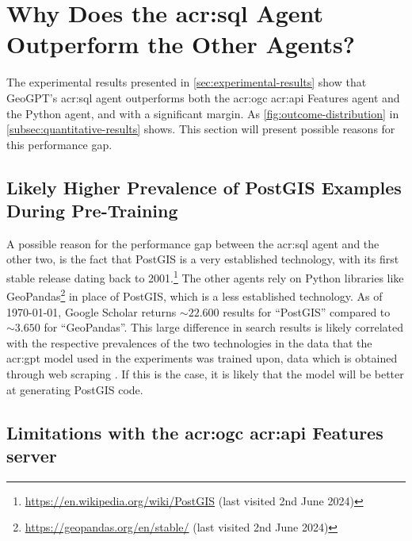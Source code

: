 

\section[Why Does the SQL Agent Outperform the Other Agents?]{Why Does the \acrshort{acr:sql} Agent Outperform the Other Agents?}
\label{sec:why-sql-better}

The experimental results presented in \autoref{sec:experimental-results} show that GeoGPT's \acrshort{acr:sql} agent outperforms both the \acrshort{acr:ogc} \acrshort{acr:api} Features agent and the Python agent, and with a significant margin. As \autoref{fig:outcome-distribution} in \autoref{subsec:quantitative-results} shows. This section will present possible reasons for this performance gap.

\subsection{Likely Higher Prevalence of PostGIS Examples During Pre-Training}

A possible reason for the performance gap between the \acrshort{acr:sql} agent and the other two, is the fact that PostGIS is a very established technology, with its first stable release dating back to 2001.\footnote{\url{https://en.wikipedia.org/wiki/PostGIS} (last visited 2nd June 2024)} The other agents rely on Python libraries like GeoPandas\footnote{\url{https://geopandas.org/en/stable/} (last visited 2nd June 2024)} in place of PostGIS, which is a less established technology. As of \today, Google Scholar returns $\sim 22.600$ results for \enquote{PostGIS} compared to  $\sim 3.650$ for \enquote{GeoPandas}. This large difference in search results is likely correlated with the respective prevalences of the two technologies in the data that the \acrshort{acr:gpt} model used in the experiments was trained upon, data which is obtained through web scraping \citep[3]{radfordLanguageModelsAre2019}. If this is the case, it is likely that the model will be better at generating PostGIS code.

\subsection[Limitations with the OGC API Features server]{Limitations with the \acrshort{acr:ogc} \acrshort{acr:api} Features server}
\label{subsec:difficulties-with-oaf}

